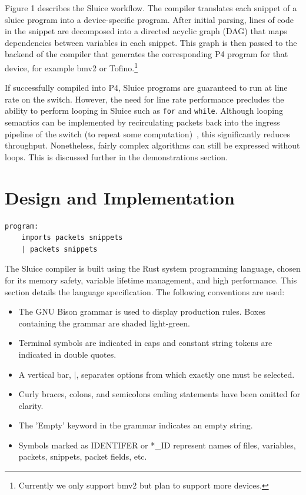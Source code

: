 \documentclass[12pt, oneside]{article}
\begin{document}
Figure 1 describes the Sluice workflow. The compiler translates each snippet of
a sluice program into a device-specific program. After initial parsing, lines
of code in the snippet are decomposed into a directed acyclic graph (DAG) that
maps dependencies between variables in each snippet. This graph is then passed
to the backend of the compiler that generates the corresponding P4 program for
that device, for example bmv2 or Tofino.\footnote{Currently we only support
bmv2 but plan to support more devices.} 

If successfully compiled into P4, Sluice programs are guaranteed to run at line rate on the switch. However, the need for line rate performance precludes the ability to perform looping in Sluice such as \texttt{for} and \texttt{while}. Although looping semantics can be implemented by recirculating packets back into the ingress pipeline of the switch (to repeat some computation)~\cite{p4Spec}, this significantly reduces throughput. Nonetheless, fairly complex algorithms can still be expressed without loops. This is discussed further in the demonstrations section. 

\newpage
\section{Design and Implementation}

\begin{lstlisting}[basicstyle=\linespread{1.3}\scriptsize,  numberstyle=\tiny, backgroundcolor = \color{teagreen}, frame=tlrb]
program:
	imports packets snippets				
	| packets snippets
\end{lstlisting}

The Sluice compiler is built using the Rust system programming language, chosen for its memory safety, variable lifetime management, and high performance. This section details the language specification. The following conventions are used:

\begin{itemize}
  \item The GNU Bison grammar is used to display production rules. Boxes containing the grammar are shaded light-green.
  \item Terminal symbols are indicated in caps and constant string tokens are indicated in double quotes.
  \item A vertical bar, $|$, separates options from which exactly one must be selected.
  \item Curly braces, colons, and semicolons ending statements have been omitted for clarity.
  \item The 'Empty' keyword in the grammar indicates an empty string.
  \item Symbols marked as IDENTIFER or *\_ID represent names of files, variables, packets, snippets, packet fields, etc.
\end{itemize}
\end{document}

